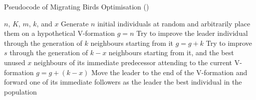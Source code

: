 \begin{algorithm}[!t]
  \caption{Pseudocode of Migrating Birds Optimisation (\mbox{})}
  \label{pseu:mbo_orig}
  \begin{algorithmic}[1]
    \REQUIRE $n$, $K$, $m$, $k$, and $x$
    \STATE Generate $n$ initial individuals at random and arbitrarily place them on a hypothetical V-formation
    \STATE $g = n$
        \STATE Try to improve the leader individual through the generation of $k$ neighbours starting from it
        \STATE $g = g + k$
          \STATE Try to improve $s$ through the generation of $k - x$ neighbours starting from it, and the best
                 unused $x$ neighbours of its immediate predecessor attending to the current V-formation
          \STATE $g = g + (k - x)$
        \ENDFOR
      \ENDFOR
      \STATE Move the leader to the end of the V-formation and forward one of its immediate followers as the leader
    \ENDWHILE
    \RETURN the best individual in the population
  \end{algorithmic}
\end{algorithm}